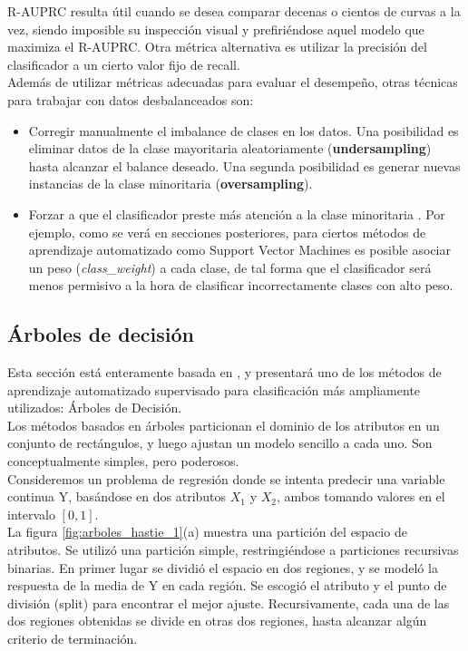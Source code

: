 R-AUPRC resulta útil cuando se desea comparar decenas o cientos de curvas a la vez, siendo imposible su inspección visual y prefiriéndose aquel modelo que maximiza el R-AUPRC. Otra métrica alternativa es utilizar la precisión del clasificador a un cierto valor fijo de recall. \\

Además de utilizar métricas adecuadas para evaluar el desempeño, otras técnicas para trabajar con datos desbalanceados son:

\begin{itemize}
\item Corregir manualmente el imbalance de clases en los datos. Una posibilidad es eliminar datos de la clase mayoritaria aleatoriamente (\textbf{undersampling}) \cite{nathalie} hasta alcanzar el balance deseado. Una segunda posibilidad es generar nuevas instancias de la clase minoritaria (\textbf{oversampling}). \cite{he}
\item Forzar a que el clasificador preste más atención a la clase minoritaria \cite{imbalanced_svm}. Por ejemplo, como se verá en secciones posteriores, para ciertos métodos de aprendizaje automatizado como Support Vector Machines es posible asociar un peso (\textit{class\_weight}) a cada clase, de tal forma que el clasificador será menos permisivo a la hora de clasificar incorrectamente clases con alto peso.
\end{itemize}

\subsection{Árboles de decisión}
Esta sección está enteramente basada en \cite{statisticallearning}, y presentará uno de los métodos de aprendizaje automatizado supervisado para clasificación más ampliamente utilizados: Árboles de Decisión. \\

Los métodos basados en árboles particionan el dominio de los atributos en un conjunto de rectángulos, y luego ajustan un modelo sencillo a cada uno. Son conceptualmente simples, pero poderosos.\\

Consideremos un problema de regresión donde se intenta predecir una variable continua Y, basándose en dos atributos $X_1$ y $X_2$, ambos tomando valores en el intervalo $[0,1]$. \\

La figura \ref{fig:arboles_hastie_1}(a) muestra una partición del espacio de atributos. Se utilizó una partición simple, restringiéndose a particiones recursivas binarias. En primer lugar se dividió el espacio en dos regiones, y se modeló la respuesta de la media de Y en cada región. Se escogió el atributo y el punto de división (split) para encontrar el mejor ajuste. Recursivamente, cada una de las dos regiones obtenidas se divide en otras dos regiones, hasta alcanzar algún criterio de terminación. \\

